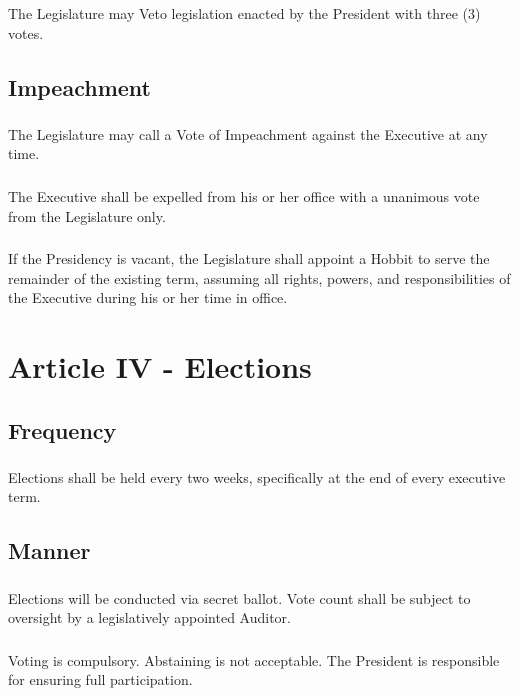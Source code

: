 \documentclass[]{article}
\begin{document}
\subsubsection{}
The Legislature may Veto legislation enacted by the President with three (3) votes.
\subsection{Impeachment}
\subsubsection{}
The Legislature may call a Vote of Impeachment against the Executive at any time.
\subsubsection{}
The Executive shall be expelled from his or her office with a unanimous vote from the Legislature only.
\subsubsection{}
If the Presidency is vacant, the Legislature shall appoint a Hobbit to serve the remainder of the existing term, assuming all rights, powers, and responsibilities of the Executive during his or her time in office.
\section{Article IV - Elections}
\subsection{Frequency}
\subsubsection{}
Elections shall be held every two weeks, specifically at the end of every executive term.
\subsection{Manner}
\subsubsection{}
Elections will be conducted via secret ballot. Vote count shall be subject to oversight by a legislatively appointed Auditor.
\subsubsection{}
Voting is compulsory. Abstaining is not acceptable. The President is responsible for ensuring full participation.
\end{document}
